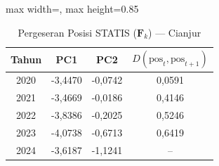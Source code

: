 \begin{table}[H]
\centering
\caption{Pergeseran Posisi STATIS ($\mathbf{F}_k$) --- Cianjur} \label{tab:app2jarak_statis_skor_cianjur}
\begin{adjustbox}{max width=\textwidth, max height=0.85\textheight}
\begin{tabular}{|c|c|c|c|}
\hline
\textbf{Tahun} & \textbf{PC1} & \textbf{PC2} & \textbf{$D(\text{pos}_t, \text{pos}_{t+1})$} \\
\hline
2020 & -3,4470 & -0,0742 & 0,0591 \\
2021 & -3,4669 & -0,0186 & 0,4146 \\
2022 & -3,8386 & -0,2025 & 0,5246 \\
2023 & -4,0738 & -0,6713 & 0,6419 \\
2024 & -3,6187 & -1,1241 & -- \\
\hline
\end{tabular}
\end{adjustbox}
\end{table}